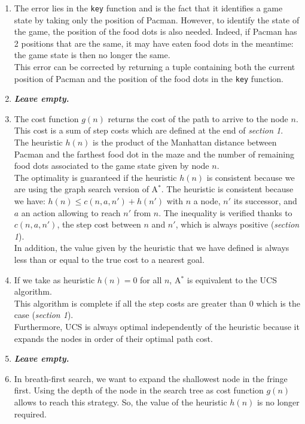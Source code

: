 \documentclass{article}
\begin{document}
\begin{enumerate}[label=\alph*.,leftmargin=1.35em]
    \item The error lies in the \texttt{key} function and is the fact that it identifies a game state by taking only the position of Pacman. However, to identify the state of the game, the position of the food dots is also needed. Indeed, if Pacman has 2 positions that are the same, it may have eaten food dots in the meantime: the game state is then no longer the same.\\
          This error can be corrected by returning a tuple containing both the current position of Pacman and the position of the food dots in the \texttt{key} function.  
    \item \textbf{{\it Leave empty.}}
    \item The cost function $g(n)$ returns the cost of the path to arrive to the node $n$. This cost is a sum of step costs which are defined at the end of \textit{section 1}.\\
    The heuristic $h(n)$ is the product of the Manhattan distance between Pacman and the farthest food dot in the maze and the number of remaining food dots associated to the game state given by node $n$.\\
    The optimality is guaranteed if the heuristic $h(n)$ is consistent because we are using the graph search version of A$^*$. The heuristic is consistent because we have: $h(n) \leq c(n,a,n') + h(n')$ with $n$ a node, $n'$ its successor, and $a$ an action allowing to reach $n'$ from $n$. The inequality is verified thanks to $c(n,a,n')$, the step cost between $n$ and $n'$, which is always positive (\textit{section 1}).\\
    In addition, the value given by the heuristic that we have defined is always less than or equal to the true cost to a nearest goal.
    \item If we take as heuristic $h(n) = 0$ for all $n$, A$^*$ is equivalent to the UCS algorithm.\\
    This algorithm is complete if all the step costs are greater than 0 which is the case (\textit{section 1}).\\
    Furthermore, UCS is always optimal independently of the heuristic because it expands the nodes in order of their optimal path cost.
    \item \textbf{{\it Leave empty.}}
    \item In breath-first search, we want to expand the shallowest node in the fringe first. Using the depth of the node in the search tree as cost function $g(n)$ allows to reach this strategy. So, the value of the heuristic $h(n)$ is no longer required.
\end{enumerate}
\end{document}

